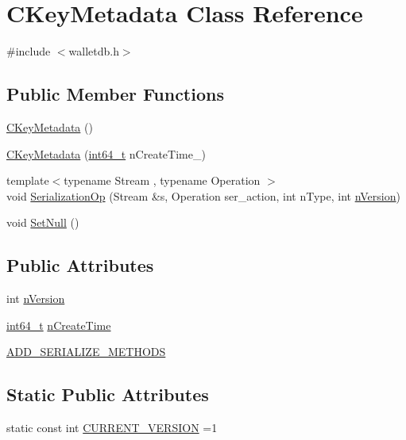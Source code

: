 \hypertarget{class_c_key_metadata}{}\section{C\+Key\+Metadata Class Reference}
\label{class_c_key_metadata}


{\ttfamily \#include $<$walletdb.\+h$>$}

\subsection*{Public Member Functions}
\begin{DoxyCompactItemize}
\item 
\hyperlink{class_c_key_metadata_aa8b0f7b007fdc16d2ebf97c893a6760b}{C\+Key\+Metadata} ()
\item 
\hyperlink{class_c_key_metadata_accabc99065b0dbdd8862b4338266893f}{C\+Key\+Metadata} (\hyperlink{stdint_8h_adec1df1b8b51cb32b77e5b86fff46471}{int64\+\_\+t} n\+Create\+Time\+\_\+)
\item 
{\footnotesize template$<$typename Stream , typename Operation $>$ }\\void \hyperlink{class_c_key_metadata_aeba08a154d4b3f6ddac96c25b852d342}{Serialization\+Op} (Stream \&s, Operation ser\+\_\+action, int n\+Type, int \hyperlink{class_c_key_metadata_a52f63ceb60b53e491666b6aa59a4d818}{n\+Version})
\item 
void \hyperlink{class_c_key_metadata_ab78641eb092af623a363b5c403c06a1f}{Set\+Null} ()
\end{DoxyCompactItemize}
\subsection*{Public Attributes}
\begin{DoxyCompactItemize}
\item 
int \hyperlink{class_c_key_metadata_a52f63ceb60b53e491666b6aa59a4d818}{n\+Version}
\item 
\hyperlink{stdint_8h_adec1df1b8b51cb32b77e5b86fff46471}{int64\+\_\+t} \hyperlink{class_c_key_metadata_accfd31222aefcbdcba1fb0214e546e6d}{n\+Create\+Time}
\item 
\hyperlink{class_c_key_metadata_a7e1f57544d6d63342bddeee5a08aba1a}{A\+D\+D\+\_\+\+S\+E\+R\+I\+A\+L\+I\+Z\+E\+\_\+\+M\+E\+T\+H\+O\+D\+S}
\end{DoxyCompactItemize}
\subsection*{Static Public Attributes}
\begin{DoxyCompactItemize}
\item 
static const int \hyperlink{class_c_key_metadata_a805f9472960eec81031596ce1133e629}{C\+U\+R\+R\+E\+N\+T\+\_\+\+V\+E\+R\+S\+I\+O\+N} =1
\end{DoxyCompactItemize}


